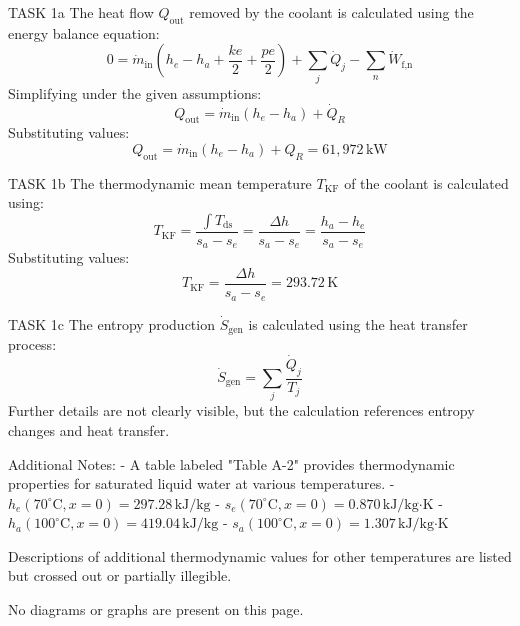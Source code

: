 TASK 1a  
The heat flow \( Q_{\text{out}} \) removed by the coolant is calculated using the energy balance equation:  
\[
0 = \dot{m}_{\text{in}} \left( h_e - h_a + \frac{ke}{2} + \frac{pe}{2} \right) + \sum_j \dot{Q}_j - \sum_n \dot{W}_{\text{f,n}}
\]  
Simplifying under the given assumptions:  
\[
Q_{\text{out}} = \dot{m}_{\text{in}} (h_e - h_a) + \dot{Q}_R
\]  
Substituting values:  
\[
Q_{\text{out}} = \dot{m}_{\text{in}} (h_e - h_a) + Q_R = 61,972 \, \text{kW}
\]  

TASK 1b  
The thermodynamic mean temperature \( T_{\text{KF}} \) of the coolant is calculated using:  
\[
T_{\text{KF}} = \frac{\int T_{\text{ds}}}{s_a - s_e} = \frac{\Delta h}{s_a - s_e} = \frac{h_a - h_e}{s_a - s_e}
\]  
Substituting values:  
\[
T_{\text{KF}} = \frac{\Delta h}{s_a - s_e} = 293.72 \, \text{K}
\]  

TASK 1c  
The entropy production \( \dot{S}_{\text{gen}} \) is calculated using the heat transfer process:  
\[
\dot{S}_{\text{gen}} = \sum_j \frac{\dot{Q}_j}{T_j}
\]  
Further details are not clearly visible, but the calculation references entropy changes and heat transfer.  

Additional Notes:  
- A table labeled "Table A-2" provides thermodynamic properties for saturated liquid water at various temperatures.  
  - \( h_e(70^\circ\text{C}, x=0) = 297.28 \, \text{kJ/kg} \)  
  - \( s_e(70^\circ\text{C}, x=0) = 0.870 \, \text{kJ/kg·K} \)  
  - \( h_a(100^\circ\text{C}, x=0) = 419.04 \, \text{kJ/kg} \)  
  - \( s_a(100^\circ\text{C}, x=0) = 1.307 \, \text{kJ/kg·K} \)  

Descriptions of additional thermodynamic values for other temperatures are listed but crossed out or partially illegible.  

No diagrams or graphs are present on this page.